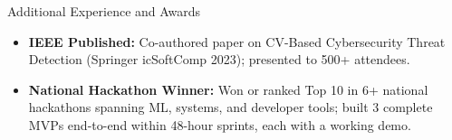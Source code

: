 \documentclass[]{mcdowellcv}
\begin{document}
\begin{cvsection}{Additional Experience and Awards}
  \begin{cvsubsection}{}{}{}
    \begin{itemize}
      \item \textbf{IEEE Published:} Co-authored paper on CV-Based Cybersecurity Threat Detection (Springer icSoftComp 2023); presented to 500+ attendees.
      \item \textbf{National Hackathon Winner:} Won or ranked Top 10 in 6+ national hackathons spanning ML, systems, and developer tools; built 3 complete MVPs end-to-end within 48-hour sprints, each with a working demo.
    \end{itemize}
  \end{cvsubsection}
\end{cvsection}
\end{document}
